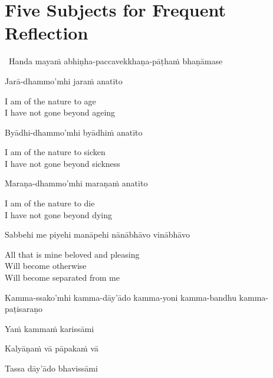 \suttaRef{[DN 13]}

\ifdigital{}\fi



\section{Five Subjects for Frequent Reflection}
\label{five-reflections}

\begin{leader}
  \anglebracketleft\ \hspace{-0.5mm}Handa mayaṁ abhiṇha-paccavekkhaṇa-pāṭhaṁ bhaṇāmase \hspace{-0.5mm}\anglebracketright\
\end{leader}

Jarā-dhammo'mhi jaraṁ anatīto

\begin{english}
  I am of the nature to age\\
  I have not gone beyond ageing
\end{english}

Byādhi-dhammo'mhi byādhiṁ anatīto

\begin{english}
  I am of the nature to sicken\\
  I have not gone beyond sickness
\end{english}

Maraṇa-dhammo'mhi maraṇaṁ anatīto

\begin{english}
  I am of the nature to die\\
  I have not gone beyond dying
\end{english}

Sabbehi me piyehi manāpehi nānābhāvo vinābhāvo

\begin{english-verses}
  All that is mine beloved and pleasing\\
  Will become otherwise\\
  Will become separated from me
\end{english-verses}

\ifninebythirteen\clearpage\fi

\begin{pali-hang}
  Kamma-ssako'mhi kamma-dāy'ādo kamma-yoni kamma-bandhu kamma-paṭisaraṇo\\
\end{pali-hang}
\begin{pali-hang-together}
  Yaṁ kammaṁ karissāmi\\
\end{pali-hang-together}
\begin{pali-hang-together}
  Kalyāṇaṁ vā pāpakaṁ vā\\
\end{pali-hang-together}
\begin{pali-hang-together}
  Tassa dāy'ādo bhavissāmi
\end{pali-hang-together}

